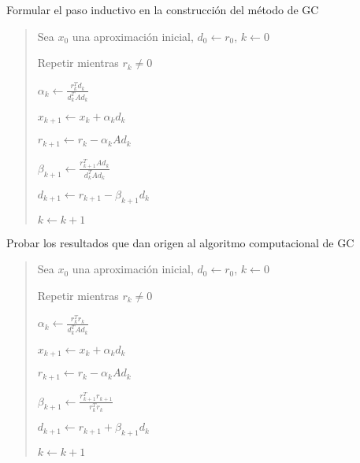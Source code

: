 \documentclass[12pt]{article}
\begin{document}
\begin{enumerate}
 \item  Formular el paso inductivo en la construcci\'on del m\'etodo de GC

\begin{quotation}
\begin{description}
 \item 
 \item Sea $x_0$ una aproximaci\'on inicial, $d_0 \leftarrow r_0$, \quad $k \leftarrow 0$
 \item Repetir mientras $r_k \ne 0$
  \begin{description}
   \item  $\displaystyle \alpha_k    \leftarrow  \frac{r_k^Td_k}{d_k^TAd_k} $
   \item  $x_{k+1}     \leftarrow  x_k + \alpha_k d_k         $    
   \item  $r_{k+1}     \leftarrow  r_k - \alpha_k Ad_k        $    
   \item  $\displaystyle \beta_{k+1} \leftarrow  \frac{r_{k+1}^TAd_k}{d_k^TAd_k} $ 
   \item  $d_{k+1}     \leftarrow  r_{k+1} - \beta_{k+1}d_k        $
   \item  $k           \leftarrow  k+1 $
  \end{description}
\end{description}
\end{quotation}

 \item Probar los resultados que dan origen al algoritmo computacional de GC

\begin{quotation}
\begin{description}
 \item 
 \item Sea $x_0$ una aproximaci\'on inicial, $d_0 \leftarrow r_0$, \quad $k \leftarrow 0$
 \item Repetir mientras $r_k \ne 0$
  \begin{description}
    \item $\displaystyle \alpha_k \leftarrow \frac{r_k^Tr_k}{d_k^TAd_k}$
    \item  $x_{k+1} \leftarrow x_k + \alpha_k d_k$
    \item $r_{k+1} \leftarrow r_k - \alpha_k Ad_k$
    \item $\displaystyle \beta_{k+1} \leftarrow \frac{r_{k+1}^Tr_{k+1}}{r_k^Tr_k}$
    \item $d_{k+1} \leftarrow r_{k+1} + \beta_{k+1}d_k$
    \item $k \leftarrow k+1$
  \end{description}
\end{description}
\end{quotation}


\end{enumerate}
\end{document}

